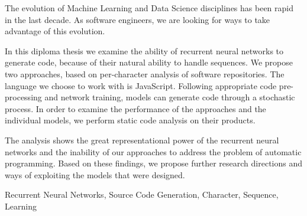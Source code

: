\begin{abstracteng}
The evolution of Machine Learning and Data Science disciplines has been rapid in the last decade.
As software engineers, we are looking for ways to take advantage of this evolution.

In this diploma thesis we examine the ability of recurrent neural networks to generate code, because of their natural ability to handle sequences.
We propose two approaches, based on per-character analysis of software repositories. The language we choose to work with is JavaScript.
Following appropriate code pre-processing and network training, models can generate code through a stochastic process.
In order to examine the performance of the approaches and the individual models, we perform static code analysis on their products.

The analysis shows the great representational power of the recurrent neural networks and the inability of our approaches to address the problem of automatic programming. Based on these findings, we propose further research directions and ways of exploiting the models that were designed.

   \begin{keywordseng}
    Recurrent Neural Networks, Source Code Generation, Character, Sequence, Learning
   \end{keywordseng}

\end{abstracteng}
